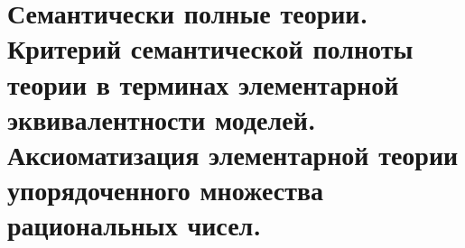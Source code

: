\section{Семантически полные теории. Критерий семантической полноты теории в терминах элементарной эквивалентности моделей. Аксиоматизация элементарной теории упорядоченного множества рациональных чисел.}